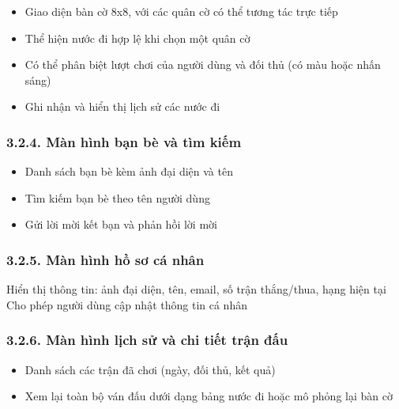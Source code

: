 \documentclass[a4paper,12pt]{article}
\begin{document}
\noindent \begin{itemize}[label=·]
    \item Giao diện bàn cờ 8x8, với các quân cờ có thể tương tác trực tiếp
    \item Thể hiện nước đi hợp lệ khi chọn một quân cờ
    \item Có thể phân biệt lượt chơi của người dùng và đối thủ (có màu hoặc nhấn sáng)
    \item Ghi nhận và hiển thị lịch sử các nước đi
\end{itemize}

\subsubsection*{3.2.4. Màn hình bạn bè và tìm kiếm} %

\noindent \begin{itemize}[label=·]
    \item Danh sách bạn bè kèm ảnh đại diện và tên
    \item Tìm kiếm bạn bè theo tên người dùng
    \item Gửi lời mời kết bạn và phản hồi lời mời
\end{itemize}

\subsubsection*{3.2.5. Màn hình hồ sơ cá nhân} %


\noindent Hiển thị thông tin: ảnh đại diện, tên, email, số trận thắng/thua, hạng hiện tại
\noindent Cho phép người dùng cập nhật thông tin cá nhân

\subsubsection*{3.2.6. Màn hình lịch sử và chi tiết trận đấu} %


\noindent \begin{itemize}[label=·]
    \item Danh sách các trận đã chơi (ngày, đối thủ, kết quả)
    \item Xem lại toàn bộ ván đấu dưới dạng bảng nước đi hoặc mô phỏng lại bàn cờ
\end{itemize}
\end{document}
